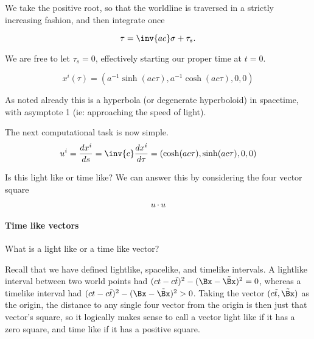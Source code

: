 {We take the positive root, so that the worldline is traversed in a strictly increasing fashion, and then integrate once

\begin{equation}\label{eqn:relativisticElectrodynamicsT2:60}
\tau = \inv{ac} \sigma + \tau_s.
\end{equation}

We are free to let \(\tau_s = 0\), effectively starting our proper time at \(t=0\).

\begin{equation}\label{eqn:relativisticElectrodynamicsT2:70}
x^i(\tau) = ( a^{-1} \sinh( a c \tau), a^{-1} \cosh( a c \tau ), 0, 0 )
\end{equation}

As noted already this is a hyperbola (or degenerate hyperboloid) in spacetime, with asymptote 1 (ie: approaching the speed of light).



The next computational task is now simple.
\begin{equation}\label{eqn:relativisticElectrodynamicsT2:77}
u^i
= \frac{dx^i}{ds} 
= \inv{c} \frac{dx^i}{d\tau} 
= ( \cosh( a c \tau ), \sinh( a c \tau ), 0, 0) \\
\end{equation}

Is this light like or time like?  We can answer this by considering the four vector square

\begin{equation}\label{eqn:relativisticElectrodynamicsT2:80}
u \cdot u 
\end{equation}

\paragraph{Time like vectors}

What is a light like or a time like vector?

Recall that we have defined lightlike, spacelike, and timelike intervals.  A lightlike interval between two world points had \((ct - c\tilde{t})^2 - (\Bx -\tilde{\Bx})^2 = 0\), whereas a timelike interval had \((ct - c\tilde{t})^2 - (\Bx -\tilde{\Bx})^2 > 0\).  Taking the vector \((c \tilde{t}, \tilde{\Bx})\) as the origin, the distance to any single four vector from the origin is then just that vector's square, so it logically makes sense to call a vector light like if it has a zero square, and time like if it has a positive square.

}
